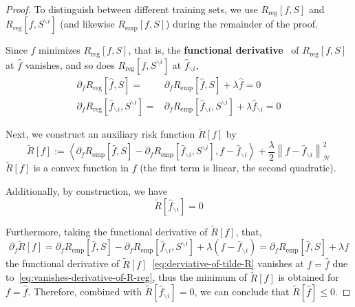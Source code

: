 \begin{proof}
	To distinguish between different training sets, we use \(R_{\text{reg}}[f, S]\) and \(R_{\text{reg}}[f, S^{\backslash i}]\) (and likewise \(R_{\text{emp}}[f, S]\)) during the remainder of the proof.

	Since \(\hat{f}\) minimizes \(R_{\text{reg}}[f,S]\), that is, the \textbf{functional derivative}~\cite{stephane2014lecture} of \(R_{\text{reg}}[f,S]\) at \(\hat{f}\) vanishes, and so does \(R_{\text{reg}}[f,S^{\backslash i}]\) at \(\hat{f}_{\backslash i}\),
	\begin{equation}
		\label{eq:vanishes-derivative-of-R-reg}
		\begin{aligned}
			\partial_{f}R_{\text{reg}}\left[\hat{f},S\right]=                               & \partial_{f}R_{\text{emp}}\left[\hat{f},S\right]+\lambda\hat{f}=0                                              \\
			\partial_{f}R_{\text{reg}}\left[\hat{f}_{\backslash i},S^{\backslash i}\right]= & \partial_{f}R_{\text{emp}}\left[\hat{f}_{\backslash i},S^{\backslash i}\right]+\lambda\hat{f}_{\backslash i}=0
		\end{aligned}
	\end{equation}

	Next, we construct an auxiliary risk function \(\tilde{R}[f]\) by
	\begin{equation}
		\tilde{R}[f]:=\left\langle\partial_{f}R_{\text{emp}}\left[\hat{f},S\right]-\partial_{f}R_{\text{emp}}\left[\hat{f}_{\backslash i},S^{\backslash i}\right],f-\hat{f}_{\backslash i}\right\rangle+\frac{\lambda}{2}\left\|f-\hat{f}_{\backslash i}\right\|_{\mathcal{H}}^{2}
	\end{equation}
	\(\tilde{R}[f]\) is a convex function in \(f\) (the first term is linear, the second quadratic).

	Additionally, by construction, we have
	\begin{equation}
		\tilde{R}[\hat{f}_{\backslash i}]=0
	\end{equation}

	Furthermore, taking the functional derivative of \(\tilde{R}[f]\), that,
	\begin{equation}
		\label{eq:derviative-of-tilde-R}
		\partial_{f}\tilde{R}[f]=\partial_{f}R_{\text{emp}}\left[\hat{f},S\right]-\partial_{f}R_{\text{emp}}\left[\hat{f}_{\backslash i},S^{\backslash i}\right]+\lambda\left(f-\hat{f}_{\backslash i}\right)=\partial_{f}R_{\text{emp}}\left[\hat{f},S\right]+\lambda f
	\end{equation}
	the functional derivative of \(\tilde{R}[f]\)~\eqref{eq:derviative-of-tilde-R} vanishes at \(f=\hat{f}\) due to~\eqref{eq:vanishes-derivative-of-R-reg}, thus the minimum of \(\tilde{R}[f]\) is obtained for \(f=\hat{f}\). Therefore, combined with \(\tilde{R}[\hat{f}_{\backslash i}]=0\), we can conclude that \(\tilde{R}[\hat{f}]\leq 0\).


\end{proof}
